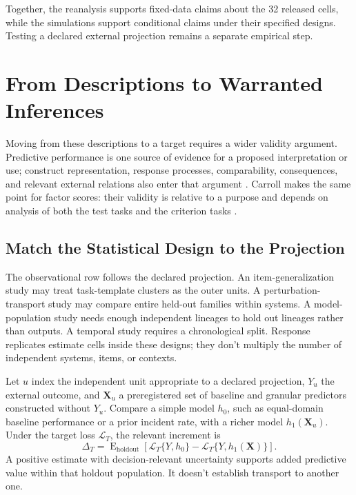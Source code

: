 \documentclass[12pt]{article}
\begin{document}
Together, the reanalysis supports fixed-data claims about the 32 released cells, while the simulations support conditional claims under their specified designs. Testing a declared external projection remains a separate empirical step.

\section{From Descriptions to Warranted Inferences}\label{sec:validation}

Moving from these descriptions to a target requires a wider validity argument. Predictive performance is one source of evidence for a proposed interpretation or use; construct representation, response processes, comparability, consequences, and relevant external relations also enter that argument \citep{messick1995Validity}. Carroll makes the same point for factor scores: their validity is relative to a purpose and depends on analysis of both the test tasks and the criterion tasks \citep[693]{carroll1993human}.

\subsection{Match the Statistical Design to the Projection}\label{ssec:matching}

The observational row follows the declared projection. An item-generalization study may treat task-template clusters as the outer units. A perturbation-transport study may compare entire held-out families within systems. A model-population study needs enough independent lineages to hold out lineages rather than outputs. A temporal study requires a chronological split. Response replicates estimate cells inside these designs; they don't multiply the number of independent systems, items, or contexts.

Let \(u\) index the independent unit appropriate to a declared projection, \(Y_u\) the external outcome, and \(\mathbf X_u\) a preregistered set of baseline and granular predictors constructed without \(Y_u\). Compare a simple model \(h_0\), such as equal-domain baseline performance or a prior incident rate, with a richer model \(h_1(\mathbf X_u)\). Under the target loss \(\mathcal L_T\), the relevant increment is
\[
\Delta_T
=\operatorname{E}_{\mathrm{holdout}}\!
\left[\mathcal L_T\{Y,h_0\}
      -\mathcal L_T\{Y,h_1(\mathbf X)\}\right].
\]
A positive estimate with decision-relevant uncertainty supports added predictive value within that holdout population. It doesn't establish transport to another one.
\end{document}
